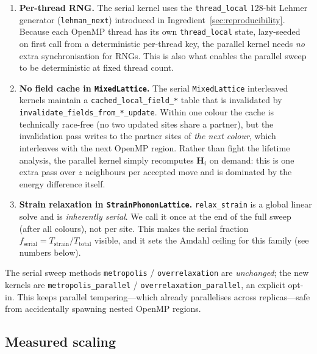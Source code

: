 \documentclass[11pt,letterpaper]{article}
\begin{document}
\begin{enumerate}[noitemsep]
  \item \textbf{Per-thread RNG.}  The serial kernel uses the
        \texttt{thread\_local} 128-bit Lehmer generator
        (\texttt{lehman\_next}) introduced in
        Ingredient~\ref{sec:reproducibility}.  Because each OpenMP
        thread has its own \texttt{thread\_local} state, lazy-seeded
        on first call from a deterministic per-thread key, the parallel
        kernel needs \emph{no} extra synchronisation for RNGs.  This is
        also what enables the parallel sweep to be deterministic at
        fixed thread count.
  \item \textbf{No field cache in \texttt{MixedLattice}.}  The serial
        \texttt{MixedLattice} interleaved kernels maintain a
        \texttt{cached\_local\_field\_*} table that is invalidated by
        \texttt{invalidate\_fields\_from\_*\_update}.  Within one
        colour the cache is technically race-free (no two updated
        sites share a partner), but the invalidation pass writes to
        the partner sites of \emph{the next colour}, which interleaves
        with the next OpenMP region.  Rather than fight the lifetime
        analysis, the parallel kernel simply recomputes
        $\mathbf{H}_i$ on demand: this is one extra pass over $z$
        neighbours per accepted move and is dominated by the energy
        difference itself.
  \item \textbf{Strain relaxation in \texttt{StrainPhononLattice}.}
        \texttt{relax\_strain} is a global linear solve and is
        \emph{inherently serial}.  We call it once at the end of the
        full sweep (after all colours), not per site.  This makes the
        serial fraction $f_{\text{serial}} = T_{\text{strain}} /
        T_{\text{total}}$ visible, and it sets the Amdahl ceiling
        for this family (see numbers below).
\end{enumerate}

The serial sweep methods \texttt{metropolis} / \texttt{overrelaxation}
are \emph{unchanged}; the new kernels are \texttt{metropolis\_parallel}
/ \texttt{overrelaxation\_parallel}, an explicit opt-in.  This keeps
parallel tempering---which already parallelises across replicas---safe
from accidentally spawning nested OpenMP regions.

\subsection{Measured scaling}
\label{sec:bench-mc-parallel}
\end{document}
